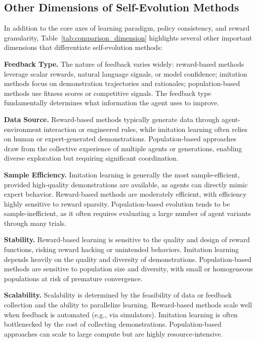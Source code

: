 \documentclass[10pt]{article} %
\begin{document}
 

\subsection{Other Dimensions of Self-Evolution Methods}

In addition to the core axes of learning paradigm, policy consistency, and reward granularity, Table~\ref{tab:comparison_dimension} highlights several other important dimensions that differentiate self-evolution methods:

\textbf{Feedback Type.}
The nature of feedback varies widely: reward-based methods leverage scalar rewards, natural language signals, or model confidence; imitation methods focus on demonstration trajectories and rationales; population-based methods use fitness scores or competitive signals. The feedback type fundamentally determines what information the agent uses to improve.

\textbf{Data Source.}
Reward-based methods typically generate data through agent-environment interaction or engineered rules, while imitation learning often relies on human or expert-generated demonstrations. Population-based approaches draw from the collective experience of multiple agents or generations, enabling diverse exploration but requiring significant coordination.

\textbf{Sample Efficiency.}
Imitation learning is generally the most sample-efficient, provided high-quality demonstrations are available, as agents can directly mimic expert behavior. Reward-based methods are moderately efficient, with efficiency highly sensitive to reward sparsity. Population-based evolution tends to be sample-inefficient, as it often requires evaluating a large number of agent variants through many trials.

\textbf{Stability.}
Reward-based learning is sensitive to the quality and design of reward functions, risking reward hacking or unintended behaviors. Imitation learning depends heavily on the quality and diversity of demonstrations. Population-based methods are sensitive to population size and diversity, with small or homogeneous populations at risk of premature convergence.

\textbf{Scalability.}
Scalability is determined by the feasibility of data or feedback collection and the ability to parallelize learning. Reward-based methods scale well when feedback is automated (e.g., via simulators). Imitation learning is often bottlenecked by the cost of collecting demonstrations. Population-based approaches can scale to large compute but are highly resource-intensive.
\end{document}
